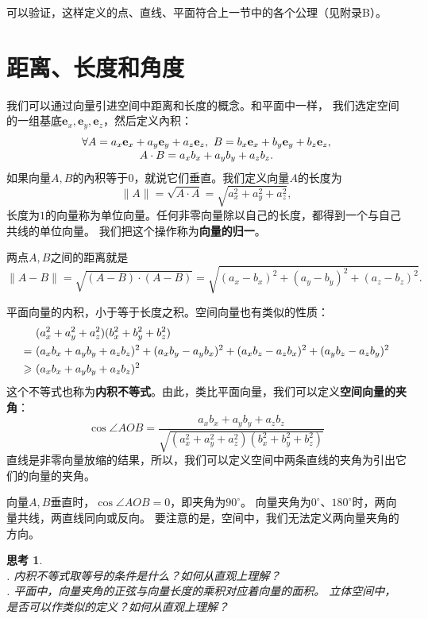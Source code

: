 \documentclass[12pt,UTF8]{ctexbook}
\newtheorem{sk}{思考}[section]
\begin{document}
可以验证，这样定义的点、直线、平面符合上一节中的各个公理（见附录B）。

\section{距离、长度和角度}
我们可以通过向量引进空间中距离和长度的概念。和平面中一样，
我们选定空间的一组基底$\mathbf{e}_x,\mathbf{e}_y,\mathbf{e}_z$，然后定义內积：
$$
\begin{array}{c}
    \forall  A = a_x\mathbf{e}_x+a_y\mathbf{e}_y+a_z\mathbf{e}_z,\,\,B = b_x\mathbf{e}_x+b_y\mathbf{e}_y+b_z\mathbf{e}_z, \notag \\
     A\cdot B = a_xb_x + a_yb_y + a_zb_z. \notag
\end{array}
$$ 
如果向量$A,B$的內积等于$0$，就说它们垂直。我们定义向量$A$的长度为
$$\|A\| = \sqrt{A\cdot A} = \sqrt{a_x^2 + a_y^2 + a_z^2},$$
长度为$1$的向量称为单位向量。任何非零向量除以自己的长度，都得到一个与自己共线的单位向量。
我们把这个操作称为\textbf{向量的归一}。

两点$A,B$之间的距离就是
$$\|A-B\| = \sqrt{(A - B)\cdot(A-B)} = \sqrt{(a_x - b_x)^2 + (a_y-b_y)^2 + (a_z-b_z)^2}. $$

平面向量的内积，小于等于长度之积。空间向量也有类似的性质：
\begin{align}
    &(a_x^2 + a_y^2 + a_z^2)(b_x^2 + b_y^2 + b_z^2) \notag \\
    =\,\,& (a_xb_x + a_yb_y + a_zb_z)^2 + (a_xb_y - a_yb_x)^2 + (a_xb_z - a_zb_x)^2 + (a_yb_z - a_zb_y)^2 \notag \\
    \geqslant\,\,& (a_xb_x + a_yb_y + a_zb_z)^2 \notag 
\end{align}
这个不等式也称为\textbf{内积不等式}。由此，类比平面向量，我们可以定义\textbf{空间向量的夹角}：
$$ \cos \angle AOB = \frac{a_xb_x + a_yb_y + a_zb_z}{\sqrt{(a_x^2 + a_y^2 + a_z^2)(b_x^2 + b_y^2 + b_z^2)}}$$
直线是非零向量放缩的结果，所以，我们可以定义空间中两条直线的夹角为引出它们的向量的夹角。

向量$A,B$垂直时，$\cos \angle AOB = 0$，即夹角为$90^\circ$。
向量夹角为$0^\circ$、$180^\circ$时，两向量共线，两直线同向或反向。
要注意的是，空间中，我们无法定义两向量夹角的方向。

\begin{sk}
    \mbox{} \\
    . 内积不等式取等号的条件是什么？如何从直观上理解？\\
    . 平面中，向量夹角的正弦与向量长度的乘积对应着向量的面积。
    立体空间中，是否可以作类似的定义？如何从直观上理解？
\end{sk}
\end{document}
